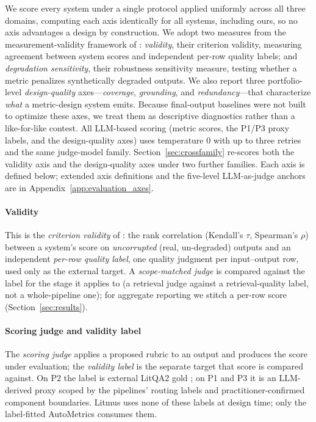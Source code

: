 \documentclass[11pt]{article}
\begin{document}
We score every system under a single protocol applied uniformly across all three domains, computing each axis identically for all systems, including ours, so no axis advantages a design by construction. We adopt two measures from the measurement-validity framework of \citet{ryan2026autometrics}: \emph{validity}, their criterion validity, measuring agreement between system scores and independent per-row quality labels; and \emph{degradation sensitivity}, their robustness sensitivity measure, testing whether a metric penalizes synthetically degraded outputs. We also report three portfolio-level \emph{design-quality} axes---\emph{coverage}, \emph{grounding}, and \emph{redundancy}---that characterize \emph{what} a metric-design system emits. Because final-output baselines were not built to optimize these axes, we treat them as descriptive diagnostics rather than a like-for-like contest. All LLM-based scoring (metric scores, the P1/P3 proxy labels, and the design-quality axes) uses temperature 0 with up to three retries and the same judge-model family. Section~\ref{sec:crossfamily} re-scores both the validity axis and the design-quality axes under two further families. Each axis is defined below; extended axis definitions and the five-level LLM-as-judge anchors are in Appendix~\ref{app:evaluation_axes}.

\paragraph{Validity} This is the \emph{criterion validity} of \citet{ryan2026autometrics}: the rank correlation (Kendall's $\tau$, Spearman's $\rho$) between a system's score on \emph{uncorrupted} (real, un-degraded) outputs and an independent \emph{per-row quality label}, one quality judgment per input--output row, used only as the external target. A \emph{scope-matched judge} is compared against the label for the stage it applies to (a retrieval judge against a retrieval-quality label, not a whole-pipeline one); for aggregate reporting we stitch a per-row score (Section~\ref{sec:results}).

\paragraph{Scoring judge and validity label} The \emph{scoring judge} applies a proposed rubric to an output and produces the score under evaluation; the \emph{validity label} is the separate target that score is compared against. On P2 the label is external LitQA2 gold \citep{skarlinski2024languageagentsachievesuperhuman}; on P1 and P3 it is an LLM-derived proxy scoped by the pipelines' routing labels and practitioner-confirmed component boundaries. Litmus uses none of these labels at design time; only the label-fitted AutoMetrics consumes them.
\end{document}

